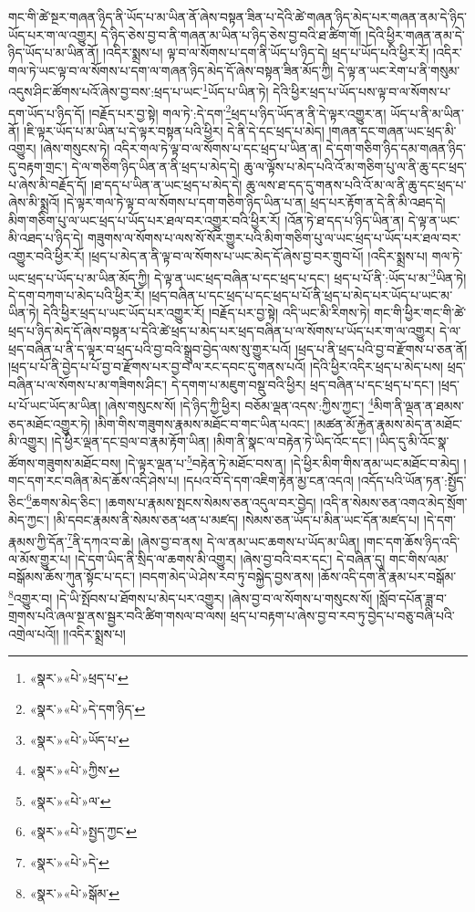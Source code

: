 གང་གི་ཚེ་སྔར་གཞན་ཉིད་ནི་ཡོད་པ་མ་ཡིན་ནོ་ཞེས་བསྟན་ཟིན་པ་དེའི་ཚེ་གཞན་ཉིད་མེད་པར་གཞན་ནམ་དེ་ཉིད་ཡོད་པར་ག་ལ་འགྱུར། དེ་ཉིད་ཅེས་བྱ་བ་ནི་གཞན་མ་ཡིན་པ་ཉིད་ཅེས་བྱ་བའི་ཐ་ཚིག་གོ། །དེའི་ཕྱིར་གཞན་ནམ་དེ་ཉིད་ཡོད་པ་མ་ཡིན་ནོ། །འདིར་སྨྲས་པ། ལྟ་བ་ལ་སོགས་པ་དག་ནི་ཡོད་པ་ཉིད་དེ། ཕྲད་པ་ཡོད་པའི་ཕྱིར་རོ། །འདིར་གལ་ཏེ་ཡང་ལྟ་བ་ལ་སོགས་པ་དག་ལ་གཞན་ཉིད་མེད་དོ་ཞེས་བསྟན་ཟིན་མོད་ཀྱི། དེ་ལྟ་ན་ཡང་རེག་པ་ནི་གསུམ་འདུས་ཤིང་ཚོགས་པའོ་ཞེས་བྱ་བས་:ཕྲད་པ་ཡང་\footnote{«སྣར་»«པེ་»ཕྲད་པ་}ཡོད་པ་ཡིན་ཏེ། དེའི་ཕྱིར་ཕྲད་པ་ཡོད་པས་ལྟ་བ་ལ་སོགས་པ་དག་ཡོད་པ་ཉིད་དོ། །བརྗོད་པར་བྱ་སྟེ། གལ་ཏེ་:དེ་དག་\footnote{«སྣར་»«པེ་»དེ་དག་ཉིད་}ཕྲད་པ་ཉིད་ཡོད་ན་ནི་དེ་ལྟར་འགྱུར་ན། ཡོད་པ་ནི་མ་ཡིན་ནོ། །ཇི་ལྟར་ཡོད་པ་མ་ཡིན་པ་དེ་ལྟར་བསྟན་པའི་ཕྱིར། དེ་ནི་དེ་དང་ཕྲད་པ་མེད། །གཞན་དང་གཞན་ཡང་ཕྲད་མི་འགྱུར། །ཞེས་གསུངས་ཏེ། འདིར་གལ་ཏེ་ལྟ་བ་ལ་སོགས་པ་དང་ཕྲད་པ་ཡིན་ན། དེ་དག་གཅིག་ཉིད་དམ་གཞན་ཉིད་དུ་བརྟག་གྲང་། དེ་ལ་གཅིག་ཉིད་ཡིན་ན་ནི་ཕྲད་པ་མེད་དེ། ཆུ་ལ་ལྟོས་པ་མེད་པའི་འོ་མ་གཅིག་པུ་ལ་ནི་ཆུ་དང་ཕྲད་པ་ཞེས་མི་བརྗོད་དོ། །ཐ་དད་པ་ཡིན་ན་ཡང་ཕྲད་པ་མེད་དེ། ཆུ་ལས་ཐ་དད་དུ་གནས་པའི་འོ་མ་ལ་ནི་ཆུ་དང་ཕྲད་པ་ཞེས་མི་སྨྲའོ། །དེ་ལྟར་གལ་ཏེ་ལྟ་བ་ལ་སོགས་པ་དག་གཅིག་ཉིད་ཡིན་པ་ན། ཕྲད་པར་རྟོག་ན་དེ་ནི་མི་འཐད་དེ། མིག་གཅིག་པུ་ལ་ཡང་ཕྲད་པ་ཡོད་པར་ཐལ་བར་འགྱུར་བའི་ཕྱིར་རོ། །འོན་ཏེ་ཐ་དད་པ་ཉིད་ཡིན་ན། དེ་ལྟ་ན་ཡང་མི་འཐད་པ་ཉིད་དེ། གཟུགས་ལ་སོགས་པ་ལས་སོ་སོར་གྱུར་པའི་མིག་གཅིག་པུ་ལ་ཡང་ཕྲད་པ་ཡོད་པར་ཐལ་བར་འགྱུར་བའི་ཕྱིར་རོ། །ཕྲད་པ་མེད་ན་ནི་ལྟ་བ་ལ་སོགས་པ་ཡང་མེད་དོ་ཞེས་བྱ་བར་གྲུབ་པོ། །འདིར་སྨྲས་པ། གལ་ཏེ་ཡང་ཕྲད་པ་ཡོད་པ་མ་ཡིན་མོད་ཀྱི། དེ་ལྟ་ན་ཡང་ཕྲད་བཞིན་པ་དང་ཕྲད་པ་དང་། ཕྲད་པ་པོ་ནི་:ཡོད་པ་མ་\footnote{«སྣར་»«པེ་»ཡོད་པ་}ཡིན་ཏེ། དེ་དག་བཀག་པ་མེད་པའི་ཕྱིར་རོ། །ཕྲད་བཞིན་པ་དང་ཕྲད་པ་དང་ཕྲད་པ་པོ་ནི་ཕྲད་པ་མེད་པར་ཡོད་པ་ཡང་མ་ཡིན་ཏེ། དེའི་ཕྱིར་ཕྲད་པ་ཡང་ཡོད་པར་འགྱུར་རོ། །བརྗོད་པར་བྱ་སྟེ། འདི་ཡང་མི་རིགས་ཏེ། གང་གི་ཕྱིར་གང་གི་ཚེ་ཕྲད་པ་ཉིད་མེད་དོ་ཞེས་བསྟན་པ་དེའི་ཚེ་ཕྲད་པ་མེད་པར་ཕྲད་བཞིན་པ་ལ་སོགས་པ་ཡོད་པར་ག་ལ་འགྱུར། དེ་ལ་ཕྲད་བཞིན་པ་ནི་ད་ལྟར་བ་ཕྲད་པའི་བྱ་བའི་སྒྲུབ་བྱེད་ལས་སུ་གྱུར་པའོ། །ཕྲད་པ་ནི་ཕྲད་པའི་བྱ་བ་རྫོགས་པ་ཅན་ནོ། །ཕྲད་པ་པོ་ནི་བྱེད་པ་པོ་བྱ་བ་རྫོགས་པར་བྱ་བ་ལ་རང་དབང་དུ་གནས་པའོ། །དེའི་ཕྱིར་འདིར་ཕྲད་པ་མེད་པས། ཕྲད་བཞིན་པ་ལ་སོགས་པ་མ་གཟིགས་ཤིང་། དེ་དགག་པ་མཇུག་བསྡུ་བའི་ཕྱིར། ཕྲད་བཞིན་པ་དང་ཕྲད་པ་དང་། །ཕྲད་པ་པོ་ཡང་ཡོད་མ་ཡིན། །ཞེས་གསུངས་སོ། །དེ་ཉིད་ཀྱི་ཕྱིར། བཅོམ་ལྡན་འདས་:ཀྱིས་ཀྱང་། \footnote{«སྣར་»«པེ་»ཀྱིས་}མིག་ནི་ལྡན་ན་ཐམས་ཅད་མཐོང་འགྱུར་ཏེ། །མིག་གིས་གཟུགས་རྣམས་མཐོང་བ་གང་ཡིན་པའང་། །མཚན་མོ་རྐྱེན་རྣམས་མེད་ན་མཐོང་མི་འགྱུར། །དེ་ཕྱིར་ལྡན་དང་བྲལ་བ་རྣམ་རྟོག་ཡིན། །མིག་ནི་སྣང་ལ་བརྟེན་ཏེ་ཡིད་འོང་དང་། །ཡིད་དུ་མི་འོང་སྣ་ཚོགས་གཟུགས་མཐོང་བས། །དེ་ལྟར་ལྡན་པ་\footnote{«སྣར་»«པེ་»ལ་}བརྟེན་ཏེ་མཐོང་བས་ན། །དེ་ཕྱིར་མིག་གིས་ནམ་ཡང་མཐོང་བ་མེད། །གང་དག་རང་བཞིན་མེད་ཆོས་འདི་ཤེས་པ། །དཔའ་བོ་དེ་དག་འཇིག་རྟེན་མྱ་ངན་འདའ། །འདོད་པའི་ཡོན་ཏན་:སྤྱོད་ཅིང་\footnote{«སྣར་»«པེ་»སྤྱད་ཀྱང་}ཆགས་མེད་ཅིང་། །ཆགས་པ་རྣམས་སྤངས་སེམས་ཅན་འདུལ་བར་བྱེད། །འདི་ན་སེམས་ཅན་འགའ་མེད་སྲོག་མེད་ཀྱང་། །མི་དབང་རྣམས་ནི་སེམས་ཅན་ཕན་པ་མཛད། །སེམས་ཅན་ཡོད་པ་མིན་ཡང་དོན་མཛད་པ། །དེ་དག་རྣམས་ཀྱི་དོན་\footnote{«སྣར་»«པེ་»དེ་}ནི་དཀའ་བ་ཆེ། །ཞེས་བྱ་བ་ནས། དེ་ལ་ནམ་ཡང་ཆགས་པ་ཡོད་མ་ཡིན། །གང་དག་ཆོས་ཉིད་འདི་ལ་མོས་གྱུར་པ། །དེ་དག་ཡིད་ནི་སྲིད་ལ་ཆགས་མི་འགྱུར། །ཞེས་བྱ་བའི་བར་དང་། དེ་བཞིན་དུ། གང་གིས་ལམ་བསྒོམས་ཆོས་ཀུན་སྟོང་པ་དང་། །བདག་མེད་ཡེ་ཤེས་རབ་ཏུ་བསྐྱེད་བྱས་ནས། །ཆོས་འདི་དག་ནི་རྣམ་པར་བསྒོམ་\footnote{«སྣར་»«པེ་»སྒོམ་}འགྱུར་བ། །དེ་ཡི་སྤོབས་པ་ཐོགས་པ་མེད་པར་འགྱུར། །ཞེས་བྱ་བ་ལ་སོགས་པ་གསུངས་སོ། །སློབ་དཔོན་ཟླ་བ་གྲགས་པའི་ཞལ་སྔ་ནས་སྦྱར་བའི་ཚིག་གསལ་བ་ལས། ཕྲད་པ་བརྟག་པ་ཞེས་བྱ་བ་རབ་ཏུ་བྱེད་པ་བཅུ་བཞི་པའི་འགྲེལ་པའོ།། །།འདིར་སྨྲས་པ། 